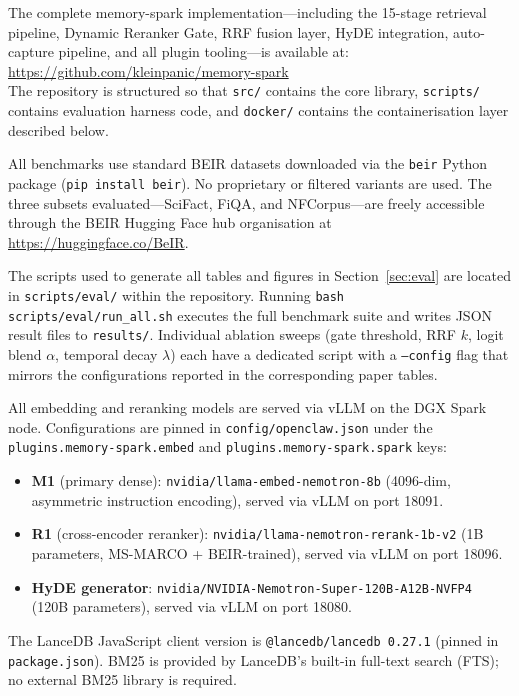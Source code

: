 \documentclass[11pt]{article}
\begin{document}
\begin{description}[leftmargin=2em, itemsep=4pt]
  \item[\textbf{Source code.}]
    The complete memory-spark implementation---including the 15-stage retrieval
    pipeline, Dynamic Reranker Gate, RRF fusion layer, HyDE integration, auto-capture
    pipeline, and all plugin tooling---is available at:\\
    \url{https://github.com/kleinpanic/memory-spark}\\
    The repository is structured so that \texttt{src/} contains the core library,
    \texttt{scripts/} contains evaluation harness code, and \texttt{docker/} contains
    the containerisation layer described below.

  \item[\textbf{Evaluation datasets.}]
    All benchmarks use standard BEIR \citep{thakur2021beir} datasets downloaded
    via the \texttt{beir} Python package (\texttt{pip install beir}).
    No proprietary or filtered variants are used.
    The three subsets evaluated---SciFact, FiQA, and NFCorpus---are freely
    accessible through the BEIR Hugging Face hub organisation at
    \url{https://huggingface.co/BeIR}.

  \item[\textbf{Evaluation scripts.}]
    The scripts used to generate all tables and figures in Section~\ref{sec:eval}
    are located in \texttt{scripts/eval/} within the repository.
    Running \texttt{bash scripts/eval/run\_all.sh} executes the full benchmark
    suite and writes JSON result files to \texttt{results/}.
    Individual ablation sweeps (gate threshold, RRF $k$, logit blend $\alpha$,
    temporal decay $\lambda$) each have a dedicated script with a
    \texttt{--config} flag that mirrors the configurations reported in the
    corresponding paper tables.

  \item[\textbf{Model versions.}]
    All embedding and reranking models are served via vLLM on the DGX Spark node.
    Configurations are pinned in \texttt{config/openclaw.json} under the
    \texttt{plugins.memory-spark.embed} and \texttt{plugins.memory-spark.spark} keys:
    \begin{itemize}[leftmargin=2em, itemsep=2pt]
      \item \textbf{M1} (primary dense): \texttt{nvidia/llama-embed-nemotron-8b}
            (4096-dim, asymmetric instruction encoding), served via vLLM on port 18091.
      \item \textbf{R1} (cross-encoder reranker): \texttt{nvidia/llama-nemotron-rerank-1b-v2}
            (1B parameters, MS-MARCO + BEIR-trained), served via vLLM on port 18096.
      \item \textbf{HyDE generator}: \texttt{nvidia/NVIDIA-Nemotron-Super-120B-A12B-NVFP4}
            (120B parameters), served via vLLM on port 18080.
    \end{itemize}
    The LanceDB JavaScript client version is \texttt{@lancedb/lancedb 0.27.1} (pinned in
    \texttt{package.json}).
    BM25 is provided by LanceDB's built-in full-text search (FTS); no external
    BM25 library is required.
\end{description}
\end{document}
